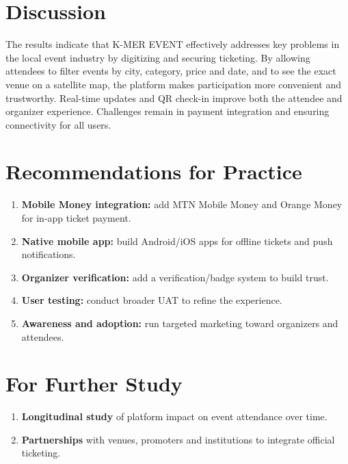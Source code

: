\documentclass[12pt,a4paper]{report}
\begin{document}
\section{Discussion}
The results indicate that K-MER EVENT effectively addresses key problems in the local event
industry by digitizing and securing ticketing. By allowing attendees to filter events by
city, category, price and date, and to see the exact venue on a satellite map, the platform
makes participation more convenient and trustworthy. Real-time updates and QR check-in
improve both the attendee and organizer experience. Challenges remain in payment integration
and ensuring connectivity for all users.

\section{Recommendations for Practice}
\begin{enumerate}
  \item \textbf{Mobile Money integration:} add MTN Mobile Money and Orange Money for in-app
        ticket payment.
  \item \textbf{Native mobile app:} build Android/iOS apps for offline tickets and push
        notifications.
  \item \textbf{Organizer verification:} add a verification/badge system to build trust.
  \item \textbf{User testing:} conduct broader UAT to refine the experience.
  \item \textbf{Awareness and adoption:} run targeted marketing toward organizers and
        attendees.
\end{enumerate}

\section{For Further Study}
\begin{enumerate}
  \item \textbf{Longitudinal study} of platform impact on event attendance over time.
  \item \textbf{Partnerships} with venues, promoters and institutions to integrate official
        ticketing.
\end{enumerate}
\end{document}
